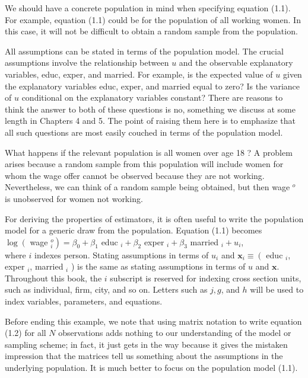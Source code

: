\documentclass[10pt]{article}
\begin{document}
We should have a concrete population in mind when specifying equation (1.1). For example, equation (1.1) could be for the population of all working women. In this case, it will not be difficult to obtain a random sample from the population.

All assumptions can be stated in terms of the population model. The crucial assumptions involve the relationship between $u$ and the observable explanatory variables, educ, exper, and married. For example, is the expected value of $u$ given the explanatory variables educ, exper, and married equal to zero? Is the variance of $u$ conditional on the explanatory variables constant? There are reasons to think the answer to both of these questions is no, something we discuss at some length in Chapters 4 and 5. The point of raising them here is to emphasize that all such questions are most easily couched in terms of the population model.

What happens if the relevant population is all women over age 18 ? A problem arises because a random sample from this population will include women for whom the wage offer cannot be observed because they are not working. Nevertheless, we can think of a random sample being obtained, but then wage ${ }^{o}$ is unobserved for women not working.

For deriving the properties of estimators, it is often useful to write the population model for a generic draw from the population. Equation (1.1) becomes\\
$\log \left(\right.$ wage $\left._{i}^{o}\right)=\beta_{0}+\beta_{1}$ educ $_{i}+\beta_{2}$ exper $_{i}+\beta_{3}$ married $_{i}+u_{i}$,\\
where $i$ indexes person. Stating assumptions in terms of $u_{i}$ and $\mathbf{x}_{i} \equiv\left(\right.$ educ $_{i}$, exper $_{i}$, married $_{i}$ ) is the same as stating assumptions in terms of $u$ and $\mathbf{x}$. Throughout this book, the $i$ subscript is reserved for indexing cross section units, such as individual, firm, city, and so on. Letters such as $j, g$, and $h$ will be used to index variables, parameters, and equations.

Before ending this example, we note that using matrix notation to write equation (1.2) for all $N$ observations adds nothing to our understanding of the model or sampling scheme; in fact, it just gets in the way because it gives the mistaken impression that the matrices tell us something about the assumptions in the underlying population. It is much better to focus on the population model (1.1).
\end{document}
